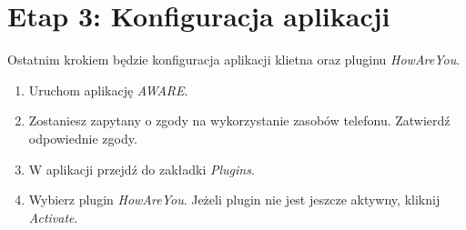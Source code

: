 \section{Etap 3: Konfiguracja aplikacji}
\label{sec:pobranieIInstalacjaAplikacji}

Ostatnim krokiem będzie konfiguracja aplikacji klietna oraz pluginu \textit{HowAreYou}.

\begin{enumerate}
	
	\item Uruchom aplikację \textit{AWARE}.
	
	\item Zostaniesz zapytany o zgody na wykorzystanie zasobów telefonu. Zatwierdź odpowiednie zgody.
	
	\item W aplikacji przejdź do zakładki \textit{Plugins}.
	
	\item Wybierz plugin \textit{HowAreYou}. Jeżeli plugin nie jest jeszcze aktywny, kliknij \textit{Activate}.
	\clearpage
	

\end{enumerate}
